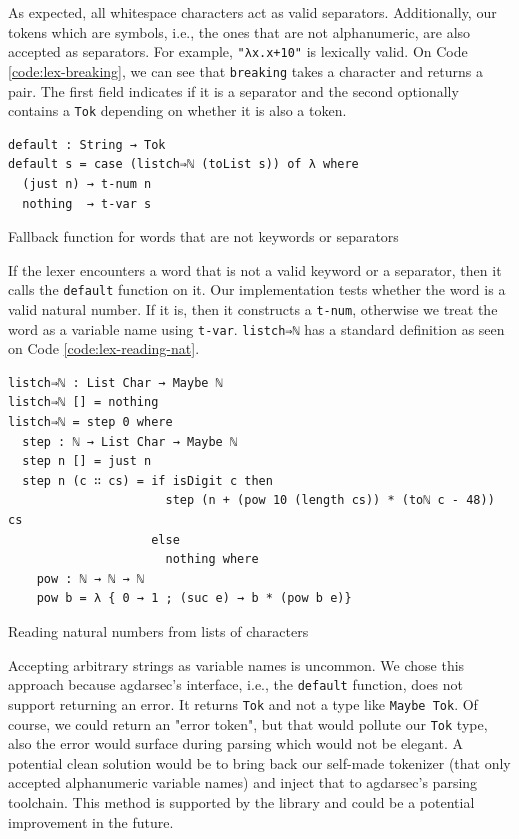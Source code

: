 As expected, all whitespace characters act as valid separators. Additionally, our tokens which are symbols, i.e., the ones that are not alphanumeric, are also accepted as separators. For example, \verb$"λx.x+10"$ is lexically valid. On Code \ref{code:lex-breaking}, we can see that \verb$breaking$ takes a character and returns a pair. The first field indicates if it is a separator and the second optionally contains a \verb$Tok$ depending on whether it is also a token.

\begin{listing}[H]
\begin{verbatim}
default : String → Tok
default s = case (listch⇒ℕ (toList s)) of λ where
  (just n) → t-num n
  nothing  → t-var s
\end{verbatim}
\caption{Fallback function for words that are not keywords or separators}
\label{code:lex-default}
\end{listing}

If the lexer encounters a word that is not a valid keyword or a separator, then it calls the \verb$default$ function on it. Our implementation tests whether the word is a valid natural number. If it is, then it constructs a \verb$t-num$, otherwise we treat the word as a variable name using \verb$t-var$. \verb$listch⇒ℕ$ has a standard definition as seen on Code \ref{code:lex-reading-nat}.

\begin{listing}[H]
\begin{verbatim}
listch⇒ℕ : List Char → Maybe ℕ
listch⇒ℕ [] = nothing
listch⇒ℕ = step 0 where
  step : ℕ → List Char → Maybe ℕ
  step n [] = just n
  step n (c ∷ cs) = if isDigit c then
                      step (n + (pow 10 (length cs)) * (toℕ c - 48)) cs
                    else
                      nothing where
    pow : ℕ → ℕ → ℕ
    pow b = λ { 0 → 1 ; (suc e) → b * (pow b e)}
\end{verbatim}
\caption{Reading natural numbers from lists of characters}
\label{code:lex-reading-nat}
\end{listing}

Accepting arbitrary strings as variable names is uncommon. We chose this approach because agdarsec's interface, i.e., the \verb$default$ function, does not support returning an error. It returns \verb$Tok$ and not a type like \verb$Maybe Tok$. Of course, we could return an "error token", but that would pollute our \verb$Tok$ type, also the error would surface during parsing which would not be elegant. A potential clean solution would be to bring back our self-made tokenizer (that only accepted alphanumeric variable names) and inject that to agdarsec's parsing toolchain. This method is supported by the library and could be a potential improvement in the future.

